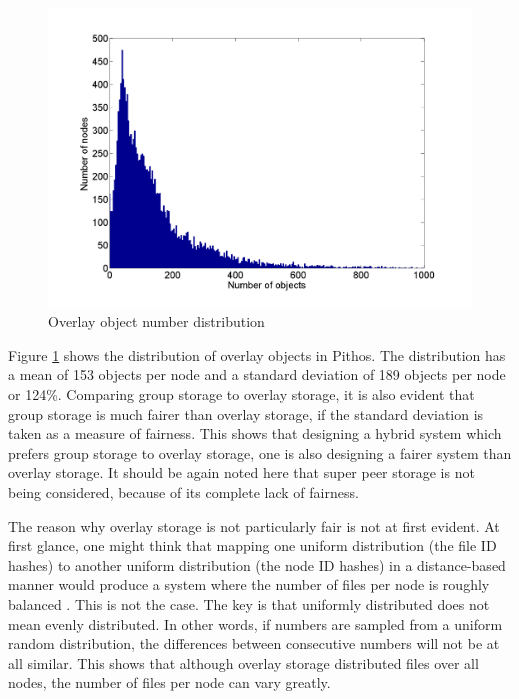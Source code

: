 \documentclass[10pt,a4paper,conference]{IEEEtran}
\begin{document}
\begin{figure}[htbp]
 \centering
 \includegraphics[clip=true, viewport=1.5cm 1.2cm 27cm 19.7cm, width=\columnwidth]{OverlayObjects}
 \caption{Overlay object number distribution}
 \label{fig_overlay_objects}
\end{figure}
%
Figure \ref{fig_overlay_objects} shows the distribution of overlay objects in Pithos. The distribution has a mean of 153 objects per node and a
standard deviation of 189 objects per node or 124\%. Comparing group storage to overlay storage, it is also evident that group storage is much fairer
than overlay storage, if the standard deviation is taken as a measure of fairness. This shows that designing a hybrid system which prefers group
storage to overlay storage, one is also designing a fairer system than overlay storage. It should be again noted here that super peer storage is not
being considered, because of its complete lack of fairness.

The reason why overlay storage is not particularly fair is not at first evident. At first glance, one might think that mapping one uniform
distribution (the file ID hashes) to another uniform distribution (the node ID hashes) in a distance-based manner would produce a system where the
number of files per node is roughly balanced \cite{storage_and_chaching_PAST}. This is not the case. The key is that uniformly distributed does not
mean evenly distributed. In other words, if numbers are sampled from a uniform random distribution, the differences between consecutive numbers will
not be at all similar. This shows that although overlay storage distributed files over all nodes, the number of files per node can vary greatly.
\end{document}
